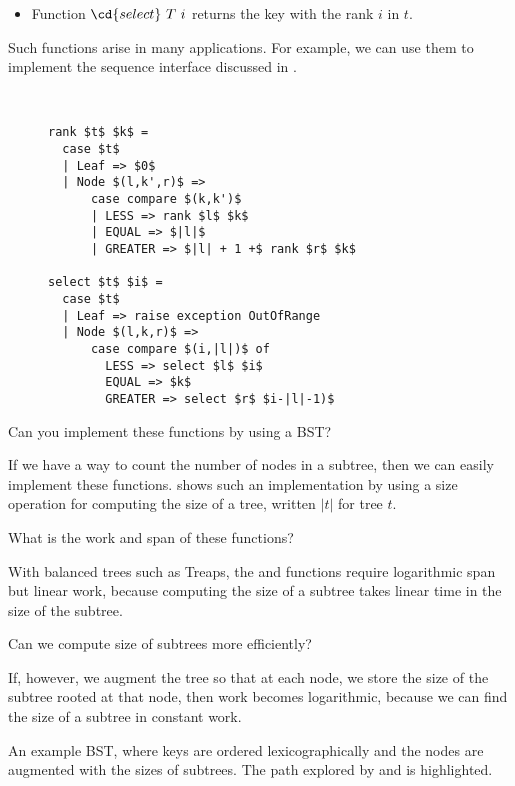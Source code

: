 \begin{chapter}
\begin{itemize}
\item Function $\cd{select}~T~i$ returns the key with the rank $i$ in $t$.

\end{itemize}
%
Such functions arise in many applications.  For example, we can use
them to implement the sequence interface discussed in . 

\begin{figure}
\begin{algorithm}[Rank]~
\begin{lstlisting}
rank $t$ $k$ =
  case $t$ 
  | Leaf => $0$
  | Node $(l,k',r)$ =>
      case compare $(k,k')$ 
      | LESS => rank $l$ $k$
      | EQUAL => $|l|$
      | GREATER => $|l| + 1 +$ rank $r$ $k$

select $t$ $i$ =
  case $t$ 
  | Leaf => raise exception OutOfRange
  | Node $(l,k,r)$ =>
      case compare $(i,|l|)$ of
        LESS => select $l$ $i$
        EQUAL => $k$
        GREATER => select $r$ $i-|l|-1)$
\end{lstlisting}

\label{alg:bst::augment::size}
\label{alg:bst::augment::select}
\label{alg:bst::augment::rank}
\end{algorithm}
\end{figure}

\begin{question}
Can you implement these functions by using a BST? 
\end{question}
If we have a way to count the number of nodes in a subtree, then we
can easily implement these functions.
%
 shows such an implementation by using a
size operation for computing the size of a tree, written $|t|$ for
tree $t$.
%
\begin{question}
What is the work and span of these functions?
\end{question}
%
With balanced trees such as Treaps, the  and 
functions require logarithmic span but linear work, because computing
the size of a subtree takes linear time in the size of the subtree.
%
\begin{question}
Can we compute size of subtrees more efficiently? 
\end{question}
%
If, however, we augment the tree so that at each node, we store the
size of the subtree rooted at that node, then work becomes
logarithmic, because we can find the size of a subtree in constant
work.

\begin{example}
An example BST, where keys are ordered lexicographically and the nodes
are augmented with the sizes of subtrees.
%
The path explored by  and  is
highlighted.


\end{example}
\end{chapter}
